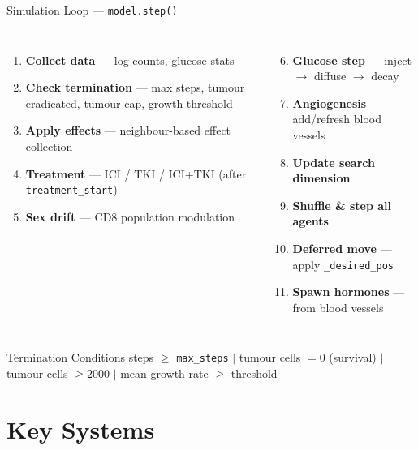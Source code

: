 \documentclass[aspectratio=169,10pt]{beamer}
\begin{document}
\begin{frame}{Simulation Loop --- \texttt{model.step()}}
  \begin{columns}[T]
    \begin{enumerate}\setlength\itemsep{0.3em}
      \item \textbf{Collect data} --- log counts, glucose stats
      \item \textbf{Check termination} --- max steps, tumour eradicated, tumour cap, growth threshold
      \item \textbf{Apply effects} --- neighbour-based effect collection
      \item \textbf{Treatment} --- ICI / TKI / ICI+TKI (after \texttt{treatment\_start})
      \item \textbf{Sex drift} --- CD8 population modulation
    \end{enumerate}

    \begin{enumerate}\setcounter{enumi}{5}\setlength\itemsep{0.3em}
      \item \textbf{Glucose step} --- inject $\to$ diffuse $\to$ decay
      \item \textbf{Angiogenesis} --- add/refresh blood vessels
      \item \textbf{Update search dimension}
      \item \textbf{Shuffle \& step all agents}
      \item \textbf{Deferred move} --- apply \texttt{\_desired\_pos}
      \item \textbf{Spawn hormones} --- from blood vessels
    \end{enumerate}
  \end{columns}

  \vspace{0.5em}
  \begin{block}{Termination Conditions}
    \centering
    \small
    steps $\geq$ \texttt{max\_steps} \quad$|$\quad
    tumour cells $= 0$ (survival) \quad$|$\quad
    tumour cells $\geq 2000$ \quad$|$\quad
    mean growth rate $\geq$ threshold
  \end{block}
\end{frame}

\section{Key Systems}
\end{document}
